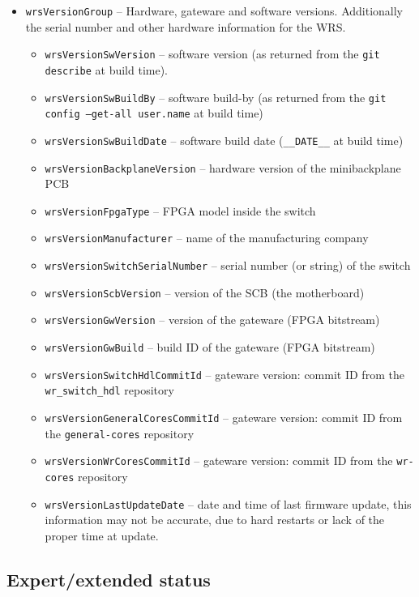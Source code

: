 \begin{itemize}
  \item \texttt{wrsVersionGroup} -- Hardware, gateware and software versions.
	Additionally the serial number and other hardware information for the WRS.
    \begin{itemize}
      \item \texttt{wrsVersionSwVersion} -- software version (as returned
        from the \texttt{git describe} at build time).
      \item \texttt{wrsVersionSwBuildBy} -- software build-by (as returned
        from the \texttt{git config --get-all user.name} at build time)
      \item \texttt{wrsVersionSwBuildDate} -- software build date
        (\texttt{\_\_DATE\_\_} at build time)
      \item \texttt{wrsVersionBackplaneVersion} -- hardware version of the
        minibackplane PCB
      \item \texttt{wrsVersionFpgaType} -- FPGA model inside the switch
      \item \texttt{wrsVersionManufacturer} -- name of the manufacturing
	company
      \item \texttt{wrsVersionSwitchSerialNumber} -- serial number (or string)
        of the switch
      \item \texttt{wrsVersionScbVersion} -- version of the SCB (the
        motherboard)
      \item \texttt{wrsVersionGwVersion} -- version of the gateware (FPGA
        bitstream)
      \item \texttt{wrsVersionGwBuild} -- build ID of the gateware (FPGA
        bitstream)
      \item \texttt{wrsVersionSwitchHdlCommitId} -- gateware version: commit ID
        from the \texttt{wr\_switch\_hdl} repository
      \item \texttt{wrsVersionGeneralCoresCommitId} -- gateware version: commit
        ID from the \texttt{general-cores} repository
      \item \texttt{wrsVersionWrCoresCommitId} -- gateware version: commit ID
        from the \texttt{wr-cores} repository
      \item \texttt{wrsVersionLastUpdateDate} -- date and time of last firmware
        update, this information may not be accurate, due to hard restarts or
        lack of the proper time at update.
    \end{itemize}
\end{itemize}

\newpage
\subsection{Expert/extended status}
\label{sec:snmp_exports:expert}

